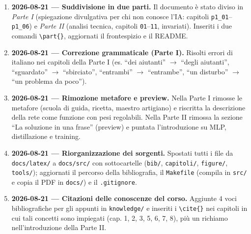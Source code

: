 \documentclass[11pt,a4paper]{report}
\begin{document}
\begin{enumerate}
  \item \textbf{2026-08-21 --- Suddivisione in due parti.} Il documento è
        stato diviso in \emph{Parte I} (spiegazione divulgativa per chi non
        conosce l'IA: capitoli \texttt{p1\_01}--\texttt{p1\_06}) e
        \emph{Parte II} (analisi tecnica, capitoli \texttt{01}--\texttt{11},
        invariati). Inseriti i due comandi \texttt{\textbackslash part\{\}},
        aggiornati il frontespizio e il README.

  \item \textbf{2026-08-21 --- Correzione grammaticale (Parte I).} Risolti
        errori di italiano nei capitoli della Parte I (es. ``dei aiutanti''
        $\to$ ``degli aiutanti'', ``sguardato'' $\to$ ``sbirciato'',
        ``entrambi'' $\to$ ``entrambe'', ``un disturbo'' $\to$ ``un problema
        da poco'').

  \item \textbf{2026-08-21 --- Rimozione metafore e preview.} Nella Parte I
        rimosse le metafore (scuola di guida, ricetta, maestro artigiano) e
        riscritta la descrizione della rete come funzione con pesi
        regolabili. Nella Parte II rimossa la sezione ``La soluzione in una
        frase'' (preview) e puntata l'introduzione su MLP, distillazione e
        training.

  \item \textbf{2026-08-21 --- Riorganizzazione dei sorgenti.} Spostati tutti
        i file da \texttt{docs/latex/} a \texttt{docs/src/} con sottocartelle
        (\texttt{bib/}, \texttt{capitoli/}, \texttt{figure/},
        \texttt{tools/}); aggiornati il percorso della bibliografia, il
        \texttt{Makefile} (compila in \texttt{src/} e copia il PDF in
        \texttt{docs/}) e il \texttt{.gitignore}.

  \item \textbf{2026-08-21 --- Citazioni delle conoscenze del corso.} Aggiunte
        4 voci bibliografiche per gli appunti in \texttt{knowledge/} e
        inseriti i \texttt{\textbackslash cite\{\}} nei capitoli in cui tali
        concetti sono impiegati (cap. 1, 2, 3, 5, 6, 7, 8), più un richiamo
        nell'introduzione della Parte II.


\end{enumerate}
\end{document}
